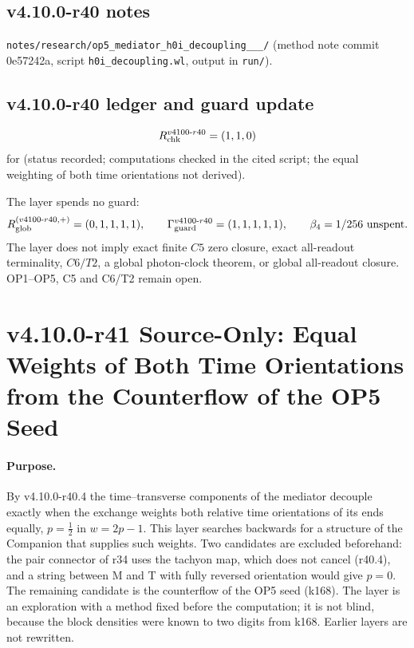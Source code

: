 \subsection*{v4.10.0-r40 notes}
\label{subsec:v4100-r40-notes}

\texttt{notes/\allowbreak research/\allowbreak op5\_\allowbreak mediator\_\allowbreak h0i\_\allowbreak decoupling\_\_\_/} (method note commit 0e57242a,
script \texttt{h0i\_\allowbreak decoupling.wl}, output in \texttt{run/}).

\subsection*{v4.10.0-r40 ledger and guard update}
\label{subsec:v4100-r40-ledger-guard}

\[
R_{\rm chk}^{v4100\text{-}r40}=(1,1,0)
\]
for (status recorded; computations checked in the cited script; the equal weighting of both time orientations not derived).

The layer spends no guard:
\[
R_{\rm glob}^{(v4100\text{-}r40,+)}=(0,1,1,1,1),
\qquad
\Gamma_{\rm guard}^{v4100\text{-}r40}=(1,1,1,1,1),
\qquad
\beta_4=1/256\ \text{unspent}.
\]
The layer does not imply exact finite \(C5\) zero closure, exact all-readout terminality, \(C6/T2\), a global photon-clock theorem,
or global all-readout closure.  OP1--OP5, C5 and C6/T2 remain open.

\clearpage
\section*{v4.10.0-r41 Source-Only: Equal Weights of Both Time Orientations from the Counterflow of the OP5 Seed}
\label{sec:v4100-r41-counterflow-orientation}

\paragraph{Purpose.}
By v4.10.0-r40.4 the time--transverse components of the mediator decouple exactly when the exchange weights both relative time
orientations of its ends equally, \(p=\tfrac12\) in \(w=2p-1\).  This layer searches backwards for a structure of the Companion that supplies
such weights.  Two candidates are excluded beforehand: the pair connector of r34 uses the tachyon map, which does not cancel (r40.4), and a
string between M and T with fully reversed orientation would give \(p=0\).  The remaining candidate is the counterflow of the OP5 seed (k168).
The layer is an exploration with a method fixed before the computation; it is not blind, because the block densities were known to two
digits from k168.  Earlier layers are not rewritten.


